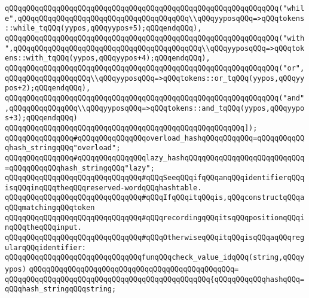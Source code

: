\verb|qQQqqQQqqQQqqQQqqQQqqQQqqQQqqQQqqQQqqQQqqQQqqQQqqQQqqQQqqQQqqQQq("while",qQQqqQQqqQQqqQQqqQQqqQQqqQQqqQQqqQQqqQQq\\qQQqyyposqQQq=>qQQqtokens::while_tqQQq(yypos,qQQqyypos+5);qQQqendqQQq),|\newline
\verb|qQQqqQQqqQQqqQQqqQQqqQQqqQQqqQQqqQQqqQQqqQQqqQQqqQQqqQQqqQQqqQQq("with",qQQqqQQqqQQqqQQqqQQqqQQqqQQqqQQqqQQqqQQqqQQq\\qQQqyyposqQQq=>qQQqtokens::with_tqQQq(yypos,qQQqyypos+4);qQQqendqQQq),|\newline
\verb|qQQqqQQqqQQqqQQqqQQqqQQqqQQqqQQqqQQqqQQqqQQqqQQqqQQqqQQqqQQqqQQq("or",qQQqqQQqqQQqqQQqqQQq\\qQQqyyposqQQq=>qQQqtokens::or_tqQQq(yypos,qQQqyypos+2);qQQqendqQQq),|\newline
\verb|qQQqqQQqqQQqqQQqqQQqqQQqqQQqqQQqqQQqqQQqqQQqqQQqqQQqqQQqqQQqqQQq("and",qQQqqQQqqQQqqQQq\\qQQqyyposqQQq=>qQQqtokens::and_tqQQq(yypos,qQQqyypos+3);qQQqendqQQq)|\newline
\verb|qQQqqQQqqQQqqQQqqQQqqQQqqQQqqQQqqQQqqQQqqQQqqQQqqQQqqQQq]);|\newline
\newline
\verb|qQQqqQQqqQQqqQQq#qQQqqQQqqQQqqQQqoverload_hashqQQqqQQqqQQq=qQQqqQQqqQQqhash_stringqQQq"overload";|\newline
\verb|qQQqqQQqqQQqqQQq#qQQqqQQqqQQqqQQqlazy_hashqQQqqQQqqQQqqQQqqQQqqQQqqQQq=qQQqqQQqqQQqhash_stringqQQq"lazy";|\newline
\newline
\verb|qQQqqQQqqQQqqQQqqQQqqQQqqQQqqQQq#qQQqSeeqQQqifqQQqanqQQqidentifierqQQqisqQQqinqQQqtheqQQqreserved-wordqQQqhashtable.|\newline
\verb|qQQqqQQqqQQqqQQqqQQqqQQqqQQqqQQq#qQQqIfqQQqitqQQqis,qQQqconstructqQQqaqQQqmatchingqQQqtoken|\newline
\verb|qQQqqQQqqQQqqQQqqQQqqQQqqQQqqQQq#qQQqrecordingqQQqitsqQQqpositionqQQqinqQQqtheqQQqinput.|\newline
\verb|qQQqqQQqqQQqqQQqqQQqqQQqqQQqqQQq#qQQqOtherwiseqQQqitqQQqisqQQqaqQQqregularqQQqidentifier:|\newline
\newline
\verb|qQQqqQQqqQQqqQQqqQQqqQQqqQQqqQQqfunqQQqcheck_value_idqQQq(string,qQQqyypos)|\newline
\verb|qQQqqQQqqQQqqQQqqQQqqQQqqQQqqQQqqQQqqQQqqQQqqQQq=|\newline
\verb|qQQqqQQqqQQqqQQqqQQqqQQqqQQqqQQqqQQqqQQqqQQqqQQq{qQQqqQQqqQQqhashqQQq=qQQqhash_stringqQQqstring;|\newline
